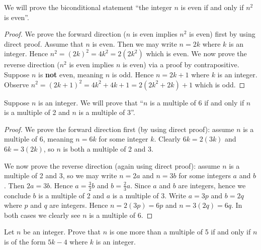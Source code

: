 \begin{example}
    We will prove the biconditional statement ``the integer $n$ is even if and only if $n^2$ is even''.
    \begin{proof}
        We prove the forward direction ($n$ is even implies $n^2$ is even) first by using direct proof. Assume that $n$ is even. Then we may write $n = 2k$ where $k$ is an integer. Hence $n^2 = (2k)^2 = 4k^2 = 2(2k^2)$ which is even.
        We now prove the reverse direction ($n^2$ is even implies $n$ is even) via a proof by contrapositive. Suppose $n$ is \textbf{not} even, meaning $n$ is odd. Hence $n = 2k + 1$ where $k$ is an integer. Observe $n^2 = (2k+1)^2 = 4k^2 + 4k + 1 = 2(2k^2 + 2k) + 1$ which is odd.
    \end{proof}
\end{example}
\begin{example}
    Suppose $n$ is an integer. We will prove that ``$n$ is a multiple of 6 if and only if $n$ is a multiple of 2 and $n$ is a multiple of 3''.
    \begin{proof}
        We prove the forward direction first (by using direct proof): assume $n$ is a multiple of 6, meaning $n = 6k$ for some integer $k$. Clearly $6k = 2(3k)$ and $6k = 3(2k)$, so $n$ is both a multiple of 2 and 3.
        
        We now prove the reverse direction (again using direct proof): assume $n$ is a multiple of 2 and 3, so we may write $n = 2a$ and $n = 3b$ for some integers $a$ and $b$. Then $2a = 3b$. Hence $a = \frac 32 b$ and $b = \frac 23 a$. Since $a$ and $b$ are integers, hence we conclude $b$ is a multiple of 2 and $a$ is a multiple of 3. Write $a = 3p$ and $b = 2q$ where $p$ and $q$ are integers. Hence $n = 2(3p) = 6p$ and $n = 3(2q) = 6q$. In both cases we clearly see $n$ is a multiple of 6.
    \end{proof}
\end{example}

\begin{exercise}
    Let $n$ be an integer. Prove that $n$ is one more than a multiple of 5 if and only if $n$ is of the form $5k - 4$ where $k$ is an integer.
\end{exercise}

